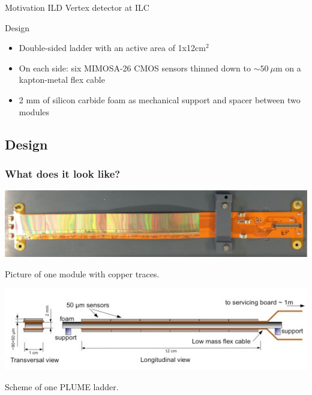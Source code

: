 \documentclass{beamer}
\begin{document}
\begin{frame}
  \begin{block}{Motivation}
    ILD Vertex detector at ILC
  \end{block}

  \vspace{-0.18cm}
  \begin{block}{Design}
    \begin{itemize}
      \item Double-sided ladder with an active area of 1x12cm$^2$
      \item On each side: six MIMOSA-26 CMOS sensors thinned down to $\sim 50~\mu$m on a kapton-metal flex cable
      \item 2 mm of silicon carbide foam as mechanical support and spacer between two modules
    \end{itemize}
  \end{block}
\end{frame}

\subsection{Design}

\begin{frame}
  \frametitle{What does it look like?}

  \begin{center}
    \includegraphics[width = 10 cm]{Pictures/PLUME_copper_module.png}

    Picture of one module with copper traces.
  \end{center}

  \vspace{-0.2cm}
  \begin{center}
    \includegraphics[width = 10 cm]{Pictures/scheme_plume.png}

    Scheme of one PLUME ladder.
  \end{center}
\end{frame}
\end{document}
